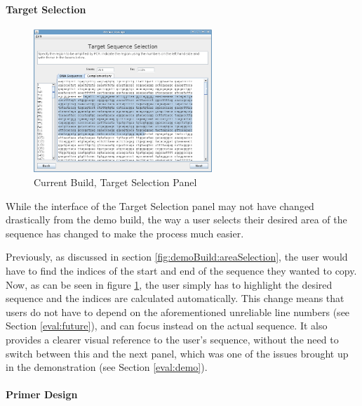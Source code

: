 \paragraph{Target Selection}

\begin{figure}[!t]
  \begin{center}
    \includegraphics[width=0.6\textwidth]{./images/currentBuild/areaSelection.png}
    \caption{
      \label{fig:currentBuild:areaSelection}
      Current Build, Target Selection Panel
    }
  \end{center}
\end{figure}

While the interface of the Target Selection panel may not have changed
drastically from the demo build, the way a user selects their desired
area of the sequence has changed to make the process much easier.

Previously, as discussed in section \ref{fig:demoBuild:areaSelection},
the user would have to find the indices of the start and end of the
sequence they wanted to copy.
Now, as can be seen in figure \ref{fig:currentBuild:areaSelection},
the user simply has to highlight the desired sequence and the indices
are calculated automatically.
This change means that users do not have to depend on the
aforementioned unreliable line numbers (see Section
\ref{eval:future}), and can focus instead on the actual sequence.
It also provides a clearer visual reference to the user's sequence,
without the need to switch between this and the next panel, which was
one of the issues brought up in the demonstration (see Section
\ref{eval:demo}).

\paragraph{Primer Design}

